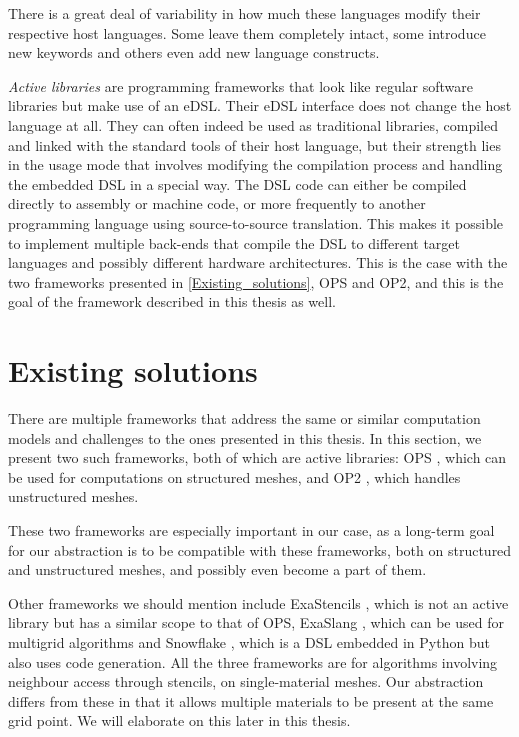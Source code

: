 \documentclass[fontsize=11pt, appendixprefix=true]{scrreprt}
\begin{document}
There is a great deal of variability in how much these languages modify their
respective host languages. Some leave them completely intact, some introduce new
keywords and others even add new language constructs.

\textit{Active libraries} are programming frameworks that look like regular
software libraries but make use of an eDSL. Their eDSL interface does not change
the host language at all. They can often indeed be used as traditional
libraries, compiled and linked with the standard tools of their host language,
but their strength lies in the usage mode that involves modifying the
compilation process and handling the embedded DSL in a special way. The DSL code
can either be compiled directly to assembly or machine code, or more frequently
to another programming language using source-to-source translation. This makes
it possible to implement multiple back-ends that compile the DSL to different
target languages and possibly different hardware architectures. This is the case
with the two frameworks presented in \autoref{Existing_solutions}, OPS and OP2,
and this is the goal of the framework described in this thesis as well.

\section{Existing solutions}
\label{Existing_solutions}

There are multiple frameworks that address the same or similar computation
models and challenges to the ones presented in this thesis. In this section, we
present two such frameworks, both of which are active libraries: OPS \cite{OPS},
which can be used for computations on structured meshes, and OP2 \cite{OP2},
which handles unstructured meshes.

These two frameworks are especially important in our case, as a long-term goal
for our abstraction is to be compatible with these frameworks, both on
structured and unstructured meshes, and possibly even become a part of them.

Other frameworks we should mention include ExaStencils \cite{ExaStencils}, which
is not an active library but has a similar scope to that of OPS, ExaSlang
\cite{ExaSlang}, which can be used for multigrid algorithms and Snowflake
\cite{Snowflake}, which is a DSL embedded in Python but also uses code
generation. All the three frameworks are for algorithms involving neighbour
access through stencils, on single-material meshes. Our abstraction differs from
these in that it allows multiple materials to be present at the same grid
point. We will elaborate on this later in this thesis.
\end{document}
